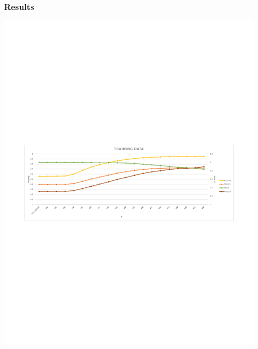 \documentclass[xelatex,usenames,dvipsnames]{beamer}
\begin{document}
  \begin{frame}[standout]
    \frametitle{Results}

    \includegraphics[width = \textwidth]{figs/Edge_Training_Results.pdf}

\end{frame}
\end{document}
